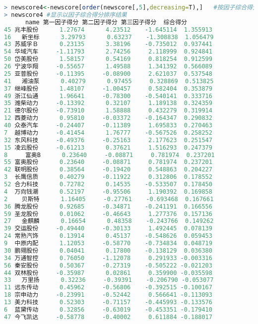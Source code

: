 \documentclass[11pt,a4paper,oneside]{book}
\begin{document}
\begin{lstlisting}[language=r]
> newscore4<-newscore[order(newscore[,5],decreasing=T),]   #按因子综合得分排序
> newscore4 #显示以因子综合得分排序结果
      name 第一因子得分 第二因子得分 第三因子得分  综合得分
45 兆丰股份      1.27674      4.23512    -1.645114  1.355913
16   新坐标      3.29793      0.63237    -1.308838  1.056479
43 苏威孚Ｂ      0.23135      3.38196    -0.735012  0.937441
54 华域汽车     -1.11793      2.74256     2.118999  0.924841
50 岱美股份      1.58157      0.54169     0.818254  0.912599
26 宁波华翔     -0.55657      1.49588     1.341392  0.566089
25 亚普股份     -0.11395     -0.08900     2.621037  0.537548
41   湘油泵      0.40279      0.97455     0.328869  0.513825
37 继峰股份      1.48107     -1.00457     0.582404  0.353879
49 浙江仙通      1.96641     -0.78300    -0.540141  0.333716
35 潍柴动力     -0.13392      0.32107     1.189138  0.324359
21 德尔股份     -0.73910      1.58888     0.432279  0.319914
12 西菱动力      0.95810     -0.03372    -0.164347  0.290832
40 众泰汽车     -0.24407     -0.11389     1.695833  0.270463
7  越博动力     -0.41454      1.76777    -0.567526  0.258252
32 东风科技     -0.49376     -0.25163     2.177623  0.251547
15 凌云股份     -0.61213      0.37621     1.516293  0.247379
8     富奥B      0.23640     -0.08871     0.781974  0.237201
55 富奥股份      0.23640     -0.08871     0.781974  0.237201
42 联明股份      0.38564     -0.19420     0.548863  0.204227
3  长鹰信质      0.40279     -0.11922     0.312806  0.178552
52 合力科技      0.72782      0.14535    -0.533507  0.178450
4  万向钱潮      0.52197     -0.95506     1.190392  0.169858
2    贝斯特      1.16405     -0.27761    -0.693468  0.167661
36 腾龙股份      0.92685     -0.34871    -0.241191  0.166556
59 圣龙股份      0.01062     -0.46643     1.277376  0.157136
27   金麒麟      0.16654      0.48358    -0.243766  0.149262
39 交运股份     -0.49440     -0.30133     1.492445  0.078139
24 常熟汽饰      0.13914      0.45137    -0.548626  0.059453
9  中原内配      1.12053     -0.58770    -0.734834  0.048719
30 鹏翎股份      0.04041      0.17800    -0.138129  0.036380
34 万通智控      0.76050     -1.12078     0.291933 -0.003316
56 秦安股份      0.50367     -0.27319    -0.505222 -0.021203
44 双林股份     -0.35987      0.02861     0.359900 -0.035598
33   万里扬      0.32236     -0.39391    -0.206790 -0.053077
11 远东传动      0.45962     -0.56806    -0.392515 -0.100167
18 宗申动力     -0.23991     -0.52442     0.566641 -0.113093
13 美力科技      0.52303     -0.71157    -0.445993 -0.133576
6  蓝黛传动      0.32856     -0.63019    -0.453351 -0.179410
47 今飞凯达     -0.58778     -0.40002     0.611884 -0.188017

\end{lstlisting}
\end{document}
